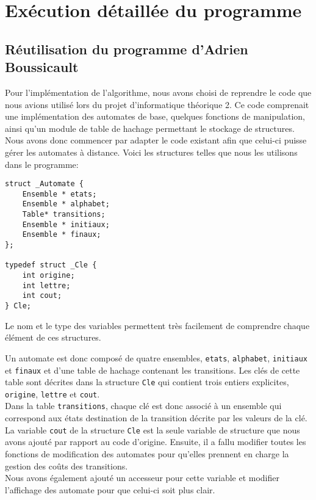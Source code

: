 \documentclass{report}
\begin{document}
\part{Exécution détaillée du programme}

\chapter{Réutilisation du programme d'Adrien Boussicault}
Pour l'implémentation de l'algorithme, nous avons choisi de reprendre le code que nous avions utilisé lors du projet d'informatique théorique 2. Ce code comprenait une implémentation des automates de base, quelques fonctions de manipulation, ainsi qu'un module de table de hachage permettant le stockage de structures.\\ 
Nous avons donc commencer par adapter le code existant afin que celui-ci puisse gérer les automates à distance. Voici les structures telles que nous les utilisons dans le programme:\\

\begin{lstlisting}[frame=single]
struct _Automate {
	Ensemble * etats;
	Ensemble * alphabet;
	Table* transitions;
	Ensemble * initiaux;
	Ensemble * finaux;
};

typedef struct _Cle {
	int origine;
	int lettre;
	int cout;
} Cle;
\end{lstlisting}
$ $\\
Le nom et le type des variables permettent très facilement de comprendre chaque élément de ces structures. 

Un automate est donc composé de quatre ensembles, \verb?etats?, \verb?alphabet?, \verb?initiaux? et \verb?finaux? et d'une table de hachage contenant les transitions. Les clés de cette table sont décrites dans la structure \verb?Cle? qui contient trois entiers explicites, \verb?origine?, \verb?lettre? et \verb?cout?.\\
Dans la table \verb?transitions?, chaque clé est donc associé à un ensemble qui correspond aux états destination de la transition décrite par les valeurs de la clé. La variable \verb?cout? de la structure \verb?Cle? est la seule variable de structure que nous avons ajouté par rapport au code d'origine. Ensuite, il a fallu modifier toutes les fonctions de modification des automates pour qu'elles prennent en charge la gestion des coûts des transitions.\\
Nous avons également ajouté un accesseur pour cette variable et modifier l'affichage des automate pour que celui-ci soit plus clair.\\
\end{document}
